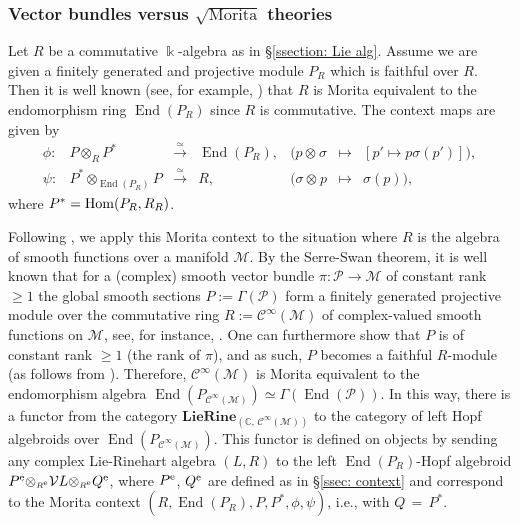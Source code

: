 \documentclass[reqno, a4paper, 10pt]{amsart}
\numberwithin{equation}{section}
\theoremstyle{plain}
\theoremstyle{definition}
\theoremstyle{remark}
\begin{document}
\subsubsection{Vector bundles versus  $\sqrt{\mbox{Morita}}$ theories} \label{ssection: versus} 
Let $R$ be a commutative  $\Bbbk$-algebra as in \S\ref{ssection: Lie alg}.  
Assume we are given  a finitely generated and projective module $P_R$ which is faithful over $R$.
Then it is well known (see, for example, \cite[Corollary 1.10]{DeMeyer/Ingraham:1971}) that $R$ is Morita equivalent to the endomorphism 
ring ${\operatorname{End}({P_R})}$ since $R$ is commutative.  The context maps are given by 
$$
\begin{array}{rrrllll}
\phi:& P{\otimes_{\scriptscriptstyle{{R}}}}P^* & \overset{\simeq}{\longrightarrow}& {\operatorname{End}({P_R})}, & (p{\otimes_{\scriptscriptstyle{{}}}}\sigma & \longmapsto & [ p' \mapsto p\sigma(p')]), \\  
\psi:& P^*{\otimes_{\scriptscriptstyle{{{\operatorname{End}({P_R})}}}}} P & \overset{\simeq}{\longrightarrow}& R, & (\sigma{\otimes_{\scriptscriptstyle{{}}}}p & \longmapsto & \sigma(p)), 
\end{array}
$$
where $P^*={\rm Hom}(P_R, R_R)$.

Following \cite[Example 2.3.3]{Khalkhali:book}, we apply this Morita context  to the situation where $R$ is the algebra of smooth functions over a manifold ${{\mathcal M}}$.
By the Serre-Swan theorem, it is well known that for a (complex) smooth vector bundle $\pi: {{\mathcal P}} \to {{\mathcal M}}$ of constant rank $\geq 1$ 
the global smooth sections $P:=\Gamma({{\mathcal P}})$ form a finitely generated projective module over the commutative ring $R:={{\mathcal C}}^{\infty}({{\mathcal M}})$ of complex-valued smooth functions on ${{\mathcal M}}$, see, for instance, \cite[Remark, p.~183]{Nestruev:03}. One can furthermore show \cite[Remarque 2, p.~145]{Bou:AC12} that $P$ is of constant rank $\geq 1$ (the rank of $\pi$), and as such,  $P$ becomes a faithful $R$-module (as follows from \cite[p.~142, Corollaire, \& p.~143, Th\'eor\`eme 3 (ii)]{Bou:AC12}).
Therefore, ${{\mathcal C}}^{\infty}({{\mathcal M}})$ is Morita equivalent to the endomorphism algebra ${\operatorname{End}({P_{{{\mathcal C}}^{\infty}({{\mathcal M}})}})} \simeq \Gamma({\operatorname{End}({{\mathcal P}})})$. 
In this way, there is a functor from the category $\mathbf{LieRine}_{(\mathbb{C},\, {{\mathcal C}}^{\infty}({{\mathcal M}}))}$ 
to the category of left Hopf algebroids over ${\operatorname{End}({P_{{{\mathcal C}}^{\infty}({{\mathcal M}})}})}$. 
This functor is defined on objects by sending any complex Lie-Rinehart algebra $(L,R)$ to the left ${\operatorname{End}({P_R})}$-Hopf algebroid ${{P^{\rm e}}}{\otimes_{\scriptscriptstyle{{R^{\rm e}}}}}{{\mathcal V}} L{\otimes_{\scriptscriptstyle{{R^{\rm e}}}}}{{Q^{\rm e}}}$, where ${{P^{\rm e}}}$, ${{Q^{\rm e}}}$ are defined as in \S\ref{ssec: context} and correspond to the Morita context $(R, {\operatorname{End}({P_R})},P, P^*, \phi,\psi)$, i.e., with $Q\,=\, P^*$.
\end{document}

